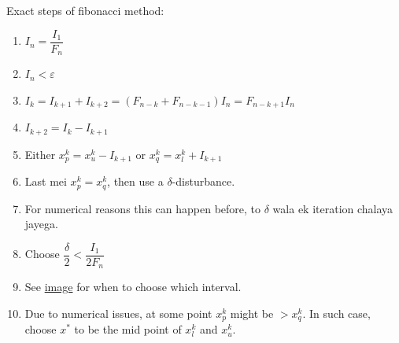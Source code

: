\documentclass[11pt]{article}
\begin{document}
Exact steps of fibonacci method:
\begin{enumerate}
    \item \(I_n=\dfrac{I_1}{F_n}\)
    \item \(I_n < \varepsilon\)
    \item \(I_k = I_{k+1}+I_{k+2} = (F_{n-k}+F_{n-k-1})I_n = F_{n-k+1}I_n\)
    \item \(I_{k+2} = I_k - I_{k+1}\)
    \item Either \(x_p^k=x_u^k-I_{k+1}\) or \(x_q^k=x_l^k+I_{k+1}\)
    \item Last mei \(x_p^k = x_q^k\), then use a \(\delta\)-disturbance.
    \item For numerical reasons this can happen before, to \(\delta\) wala ek
        iteration chalaya jayega.
    \item Choose \(\dfrac{\delta}{2}<\dfrac{I_1}{2F_n}\)
    \item See \href{https://en.wikipedia.org/wiki/File:GoldenSectionSearch.png}{image}
        for when to choose which interval.
    \item Due to numerical issues, at some point \(x_p^k\) might be \(>x_q^k\).
        In such case, choose \(x^*\) to be the mid point of \(x_l^k\) and \(x^k_u\).
\end{enumerate}
\end{document}
